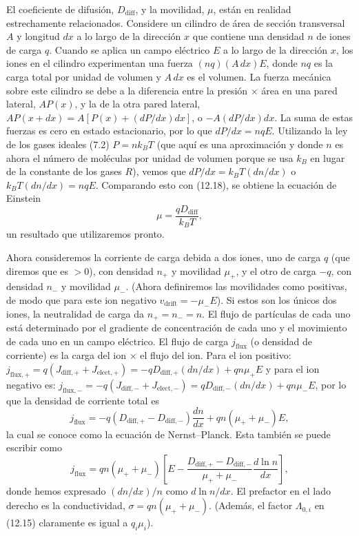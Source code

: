 \documentclass[12pt]{book}
\begin{document}
El coeficiente de difusión, $D_{\text{diff}}$, y la movilidad, $\mu$, están en realidad estrechamente relacionados. Considere un cilindro de área de sección transversal $A$ y longitud $dx$ a lo largo de la dirección $x$ que contiene una densidad $n$ de iones de carga $q$. Cuando se aplica un campo eléctrico $E$ a lo largo de la dirección $x$, los iones en el cilindro experimentan una fuerza $(nq)(A\,dx)E$, donde $nq$ es la carga total por unidad de volumen y $A\,dx$ es el volumen. La fuerza mecánica sobre este cilindro se debe a la diferencia entre la presión $\times$ área en una pared lateral, $A P(x)$, y la de la otra pared lateral, $A P(x + dx) = A[P(x) + (dP/dx)dx]$, o $-A(dP/dx)dx$. La suma de estas fuerzas es cero en estado estacionario, por lo que $dP/dx = nqE$. Utilizando la ley de los gases ideales (7.2) $P = n k_B T$ (que aquí es una aproximación y donde $n$ es ahora el número de moléculas por unidad de volumen porque se usa $k_B$ en lugar de la constante de los gases $R$), vemos que $dP/dx = k_B T (dn/dx)$ o $k_B T (dn/dx) = nqE$. Comparando esto con (12.18), se obtiene la ecuación de Einstein
\begin{equation}
\mu = \frac{q D_{\text{diff}}}{k_B T}, \label{eq:12.19}
\end{equation}
un resultado que utilizaremos pronto.

Ahora consideremos la corriente de carga debida a dos iones, uno de carga $q$ (que diremos que es $>0$), con densidad $n_+$ y movilidad $\mu_+$, y el otro de carga $-q$, con densidad $n_-$ y movilidad $\mu_-$. (Ahora definiremos las movilidades como positivas, de modo que para este ion negativo $v_{\text{drift}} = -\mu_- E$). Si estos son los únicos dos iones, la neutralidad de carga da $n_+ = n_- = n$. El flujo de partículas de cada uno está determinado por el gradiente de concentración de cada uno y el movimiento de cada uno en un campo eléctrico. El flujo de carga $j_{\text{flux}}$ (o densidad de corriente) es la carga del ion $\times$ el flujo del ion. Para el ion positivo: $j_{\text{flux},+} = q(J_{\text{diff},+} + J_{\text{elect},+}) = -q D_{\text{diff},+}(dn/dx) + qn\mu_+ E$ y para el ion negativo es: $j_{\text{flux},-} = -q(J_{\text{diff},-} + J_{\text{elect},-}) = q D_{\text{diff},-}(dn/dx) + qn\mu_- E$, por lo que la densidad de corriente total es
\begin{equation}
j_{\text{flux}} = -q(D_{\text{diff},+} - D_{\text{diff},-})\frac{dn}{dx} + qn(\mu_+ + \mu_-)E, \label{eq:12.20}
\end{equation}
la cual se conoce como la ecuación de Nernst--Planck. Esta también se puede escribir como
\begin{equation}
j_{\text{flux}} = qn(\mu_+ + \mu_-) \left[ E - \frac{D_{\text{diff},+} - D_{\text{diff},-}}{\mu_+ + \mu_-} \frac{d \ln n}{dx} \right], \label{eq:12.21}
\end{equation}
donde hemos expresado $(dn/dx)/n$ como $d \ln n/dx$. El prefactor en el lado derecho es la conductividad, $\sigma = qn(\mu_+ + \mu_-)$. (Además, el factor $\Lambda_{0,i}$ en (12.15) claramente es igual a $q_i \mu_i$).
\end{document}
